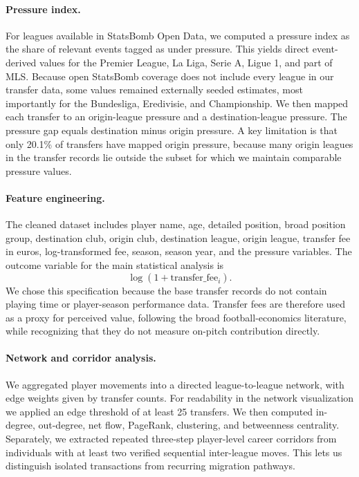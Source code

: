 \documentclass[12pt]{article}
\begin{document}
\paragraph*{Pressure index.} For leagues available in StatsBomb Open Data, we computed a pressure index as the share of relevant events tagged as under pressure. This yields direct event-derived values for the Premier League, La Liga, Serie A, Ligue 1, and part of MLS. Because open StatsBomb coverage does not include every league in our transfer data, some values remained externally seeded estimates, most importantly for the Bundesliga, Eredivisie, and Championship. We then mapped each transfer to an origin-league pressure and a destination-league pressure. The pressure gap equals destination minus origin pressure. A key limitation is that only 20.1\% of transfers have mapped origin pressure, because many origin leagues in the transfer records lie outside the subset for which we maintain comparable pressure values.

\paragraph*{Feature engineering.} The cleaned dataset includes player name, age, detailed position, broad position group, destination club, origin club, destination league, origin league, transfer fee in euros, log-transformed fee, season, season year, and the pressure variables. The outcome variable for the main statistical analysis is
\[
\log(1+\mathrm{transfer\_fee}_i).
\]
We chose this specification because the base transfer records do not contain playing time or player-season performance data. Transfer fees are therefore used as a proxy for perceived value, following the broad football-economics literature, while recognizing that they do not measure on-pitch contribution directly.

\paragraph*{Network and corridor analysis.} We aggregated player movements into a directed league-to-league network, with edge weights given by transfer counts. For readability in the network visualization we applied an edge threshold of at least 25 transfers. We then computed in-degree, out-degree, net flow, PageRank, clustering, and betweenness centrality. Separately, we extracted repeated three-step player-level career corridors from individuals with at least two verified sequential inter-league moves. This lets us distinguish isolated transactions from recurring migration pathways.
\end{document}
